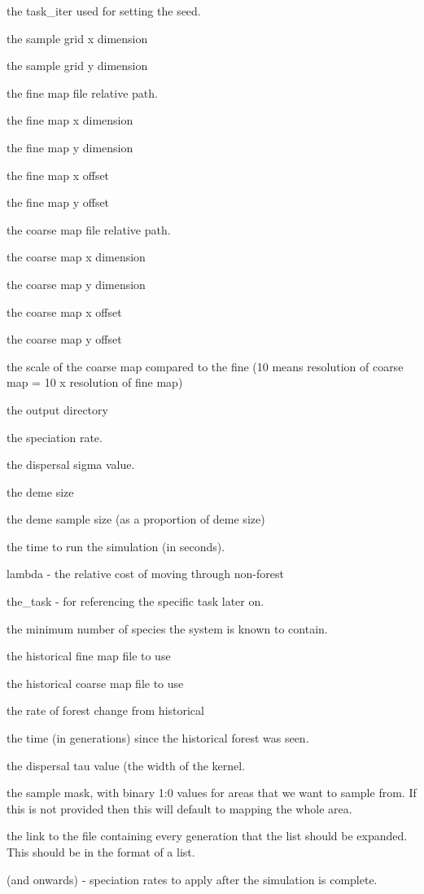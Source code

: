 \begin{DoxyEnumerate}
\item the task\+\_\+iter used for setting the seed.
\item the sample grid x dimension
\item the sample grid y dimension
\item the fine map file relative path.
\item the fine map x dimension
\item the fine map y dimension
\item the fine map x offset
\item the fine map y offset
\item the coarse map file relative path.
\item the coarse map x dimension
\item the coarse map y dimension
\item the coarse map x offset
\item the coarse map y offset
\item the scale of the coarse map compared to the fine (10 means resolution of coarse map = 10 x resolution of fine map)
\item the output directory
\item the speciation rate.
\item the dispersal sigma value.
\item the deme size
\item the deme sample size (as a proportion of deme size)
\item the time to run the simulation (in seconds).
\item lambda -\/ the relative cost of moving through non-\/forest
\item the\+\_\+task -\/ for referencing the specific task later on.
\item the minimum number of species the system is known to contain.
\item the historical fine map file to use
\item the historical coarse map file to use
\item the rate of forest change from historical
\item the time (in generations) since the historical forest was seen.
\item the dispersal tau value (the width of the kernel.
\item the sample mask, with binary 1\+:0 values for areas that we want to sample from. If this is not provided then this will default to mapping the whole area.
\item the link to the file containing every generation that the list should be expanded. This should be in the format of a list.
\item (and onwards) -\/ speciation rates to apply after the simulation is complete.
\end{DoxyEnumerate}

